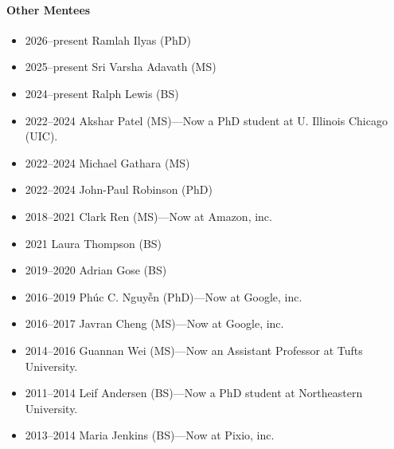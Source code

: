 \paragraph{Other Mentees}
\begin{itemize}
\vspace{0.15cm}\item 2026--present Ramlah Ilyas (PhD)
\item 2025--present Sri Varsha Adavath (MS)
\item 2024--present Ralph Lewis (BS)
\item 2022--2024 Akshar Patel (MS)---Now a PhD student at U. Illinois Chicago (UIC).
\item 2022--2024 Michael Gathara (MS)
\item 2022--2024 John-Paul Robinson (PhD)
\item 2018--2021 Clark Ren (MS)---Now at Amazon, inc.
\item 2021 Laura Thompson (BS)
\item 2019--2020 Adrian Gose (BS)
\item 2016--2019 Phúc C. Nguyễn (PhD)---Now at Google, inc.
\item 2016--2017 Javran Cheng (MS)---Now at Google, inc.
\item 2014--2016 Guannan Wei (MS)---Now an Assistant Professor at Tufts University.
\item 2011--2014 Leif Andersen (BS)---Now a PhD student at Northeastern University.
\item 2013--2014 Maria Jenkins (BS)---Now at Pixio, inc.
\end{itemize}
